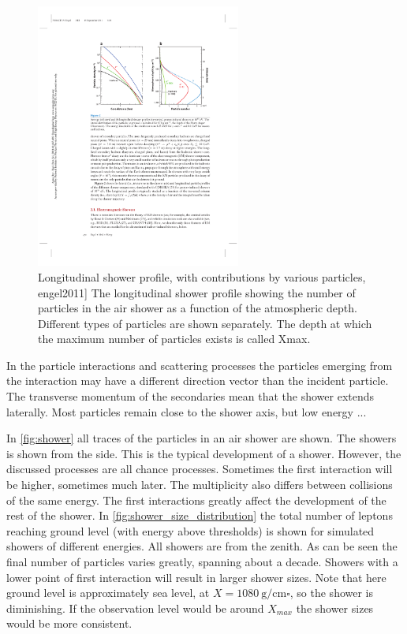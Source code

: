 \begin{figure}
    \centering
    \includegraphics[width=0.6\textwidth]
                    {plots/cosmic-rays/longitudinal_profile}
    \caption{Longitudinal shower profile, with contributions by various particles, engel2011]
The longitudinal shower profile showing the number of particles in the air shower as a function of the atmospheric depth. Different types of particles are shown separately. The depth at which the maximum number of particles exists is called Xmax.}
    \label{fig:longitudinal_profile}
\end{figure}

In the particle interactions and scattering processes the particles emerging from the interaction may have a different direction vector than the incident particle. The transverse momentum of the secondaries mean that the shower extends laterally. Most particles remain close to the shower axis, but low energy ...


In \cref{fig:shower} all traces of the particles in an air shower are shown. The showers is shown from the side. This is the typical development of a shower. However, the discussed processes are all chance processes. Sometimes the first interaction will be higher, sometimes much later. The multiplicity also differs between collisions of the same energy. The first interactions greatly affect the development of the rest of the shower. In \cref{fig:shower_size_distribution} the total number of leptons reaching ground level (with energy above thresholds) is shown for simulated showers of different energies. All showers are from the zenith. As can be seen the final number of particles varies greatly, spanning about a decade. Showers with a lower point of first interaction will result in larger shower sizes. Note that  here ground level is approximately sea level, at $X = \SI{1080}{\gram\per\centi\meter\square}$, so the shower is diminishing. If the observation level would be around $X_{max}$ the shower sizes would be more consistent.

